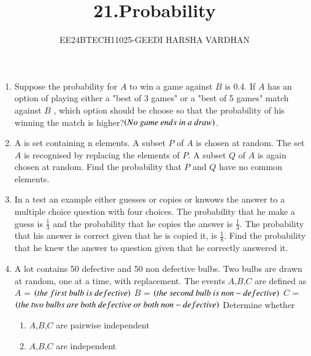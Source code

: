 \documentclass[journal,12pt,onecolumn]{IEEEtran}
\theoremstyle{remark}
\begin{document}

\vspace{3cm}

\title{21.Probability}
\author{EE24BTECH11025-GEEDI HARSHA VARDHAN}
\maketitle
\bigskip

\renewcommand{\thefigure}{\theenumi}
\renewcommand{\thetable}{\theenumi}




\begin{enumerate}
\item Suppose the probability for $A$ to win a game against $B$ is 0.4. If $A$ has an option of playing either a "best of 3 games" or a "best of 5 games" match against $B$ , which option should be choose so that the probability of his winning the match is higher?$\brak{No\ game\ ends\ in\ a\ draw}$.

\hfill{}

\item A is set containing n elements. A subset $P$ of $A$ is chosen at random. The set $A$ is recognised by replacing the elements of $P$. A subset $Q$ of $A$ is again chosen at random. Find the probability that $P$ and $Q$ have no common elements.

\hfill{}

\item In a test an example either guesses or copies or knwows the answer to a multiple choice question with four choices. The probability that he make a guess is $\frac{1}{3}$ and the probability that he copies the answer is $\frac{1}{3}$. The probability that his answer is correct given that he is copied it, is $\frac{1}{8}$. Find the probability that he knew the answer to question given that he correctly answered it.

\hfill{}



\item A lot contains 50 defective and 50 non defective bulbs. Two bulbs are drawn at random, one at a time, with replacement. The events $A$,$B$,$C$ are defined as 
$A$ = $\brak{the\ first\ bulb\ is\ defective}$
$B$ = $\brak{the\ second\ bulb\ is\ non-defective}$
$C$ = $\brak{the\ two\ bulbs\ are\ both\ defective\ or\ both\ non-defective}$
Determine whether
\begin{enumerate}
\item $A$,$B$,$C$ are pairwise independent
\item $A$,$B$,$C$ are independent
\end{enumerate}


\end{enumerate}
\end{document}
